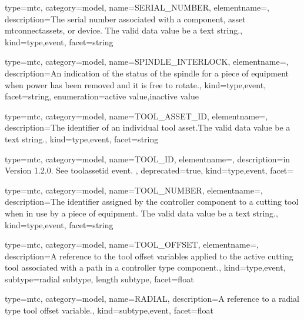 {
  type=mtc,
  category=model,
  name={SERIAL\_NUMBER},
  elementname=,
  description={The serial number associated with a \gls{component}, \gls{asset mtconnectassets}, or \gls{device}. The \gls{valid data value} \must be a text string.},
  kind={type,event},
  facet={\gls{string}}
}


{
  type=mtc,
  category=model,
  name={SPINDLE\_INTERLOCK},
  elementname=,
  description={An indication of the status of the spindle for a piece of equipment when power has been removed and it is free to rotate.},
  kind={type,event},
  facet={\gls{string}},
  enumeration={\gls{active value},\gls{inactive value}}
}


{
  type=mtc,
  category=model,
  name={TOOL\_ASSET\_ID},
  elementname=,
  description={The identifier of an individual tool asset.The \gls{valid data value} \must be a text string.},
  kind={type,event},
  facet={\gls{string}}
}


{
  type=mtc,
  category=model,
  name={TOOL\_ID},
  elementname=,
  description={\DEPRECATED in Version 1.2.0.   See \gls{toolassetid event}. },
  deprecated={true},
  kind={type,event},
  facet={}
}


{
  type=mtc,
  category=model,
  name={TOOL\_NUMBER},
  elementname=,
  description={The identifier assigned by the \gls{controller} component to a cutting tool when in use by a piece of equipment. \newline The \gls{valid data value} \must be a text string.},
  kind={type,event},
  facet={\gls{string}}
}


{
  type=mtc,
  category=model,
  name={TOOL\_OFFSET},
  elementname=,
  description={A reference to the tool offset variables applied to the active cutting tool associated with a \gls{path} in a \gls{controller} type component.},
  kind={type,event},
  subtype={\gls{radial subtype}, \gls{length subtype}},
  facet={\gls{float}}
}



{
  type=mtc,
  category=model,
  name={RADIAL},
  description={A reference to a radial type tool offset variable.},
  kind={subtype,event},
  facet={\gls{float}}
}

